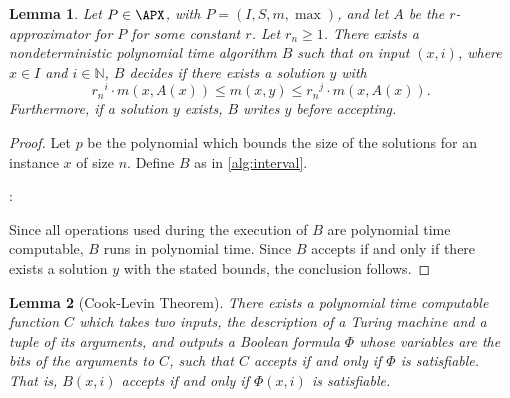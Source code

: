 \documentclass[]{article}
\theoremstyle{plain}
\newtheorem{lemma}{Lemma}
\theoremstyle{definition}
\begin{document}
\begin{lemma}\label{lem:interval}
  Let $P \in \APX$, with $P = (I, S, m, \max)$, and let $A$ be the $r$-approximator for $P$ for some constant $r$.
  Let $r_n \geq 1$.
  There exists a nondeterministic polynomial time algorithm $B$ such that on input $(x, i)$, where $x \in I$ and $i \in \mathbb{N}$, $B$ decides if there exists a solution $y$ with
  \begin{equation*}
    {r_n}^i \cdot m(x, A(x)) \leq m(x, y) \leq {r_n}^j \cdot m(x, A(x)).
  \end{equation*}
  Furthermore, if a solution $y$ exists, $B$ writes $y$ before accepting.
\end{lemma}
\begin{proof}
  Let $p$ be the polynomial which bounds the size of the solutions for an instance $x$ of size $n$.
  Define $B$ as in \autoref{alg:interval}.
  \begin{algorithm}
    \caption{Nondeterministic polynomial time algorithm that decides if there is an approximate solution for instance $x$ of problem $P$ in interval $i$%
      \label{alg:interval}}
    \begin{algorithmic}[1]
      \Statex{}
      :
        \Else
        \EndIf
      \EndFunction
    \end{algorithmic}
  \end{algorithm}
  Since all operations used during the execution of $B$ are polynomial time computable, $B$ runs in polynomial time.
  Since $B$ accepts if and only if there exists a solution $y$ with the stated bounds, the conclusion follows.
\end{proof}

\begin{lemma}[Cook-Levin Theorem]\label{lem:cooklevin}
  There exists a polynomial time computable function $C$ which takes two inputs, the description of a Turing machine and a tuple of its arguments, and outputs a Boolean formula $\Phi$ whose variables are the bits of the arguments to $C$, such that $C$ accepts if and only if $\Phi$ is satisfiable.
  That is, $B(x, i)$ accepts if and only if $\Phi(x, i)$ is satisfiable.
\end{lemma}
\end{document}
